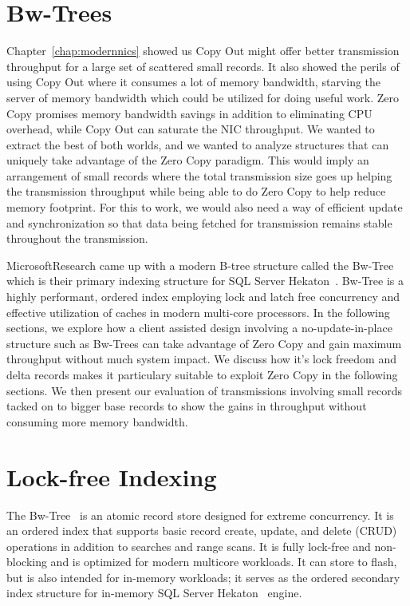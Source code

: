 \section{Bw-Trees}
Chapter~\ref{chap:modernnics} showed us Copy Out might offer better transmission throughput for a large set 
of scattered small records. It also showed the perils of using Copy Out where it consumes a lot of memory bandwidth, 
starving the server of memory bandwidth which could be utilized for doing useful work.
Zero Copy promises memory bandwidth savings in addition to eliminating CPU overhead, 
while Copy Out can saturate the NIC throughput. We wanted to extract the best of both worlds, 
and we wanted to analyze structures that can uniquely take advantage of the 
Zero Copy paradigm. This would imply an arrangement of small records where the total transmission size 
goes up helping the transmission throughput while being able to do Zero Copy to help reduce memory footprint. For this 
to work, we would also need a way of efficient update and synchronization so that data being fetched for transmission remains 
stable throughout the transmission.

Microsoft\textregistered Research came up with a modern B-tree structure called 
the Bw-Tree~\cite{bw-tree} which is their primary indexing structure for SQL Server Hekaton~\cite{hekaton}.
Bw-Tree is a highly performant, ordered index employing lock and latch free concurrency and effective utilization of caches in 
modern multi-core processors. In the following sections, we explore how a client assisted design involving a no-update-in-place 
structure such as Bw-Trees can take advantage of Zero Copy and gain maximum throughput 
without much system impact. We discuss how it's lock freedom and delta records makes it 
particulary suitable to exploit Zero Copy in the following sections. We then present
our evaluation of transmissions involving small records tacked on to bigger base records
to show the gains in throughput without consuming more memory bandwidth. 

\section{Lock-free Indexing}
\label{sec:bwtree-intro}
The Bw-Tree~\cite{bw-tree} is an atomic record store designed for extreme
concurrency. It is an ordered index that supports basic record create, update,
and delete (CRUD) operations in addition to searches and range scans.  It is
fully lock-free and non-blocking and is optimized for modern multicore
workloads. It can store to flash, but is also intended for in-memory
workloads; it serves as the ordered secondary index structure for in-memory SQL
Server Hekaton~\cite{hekaton} engine.

